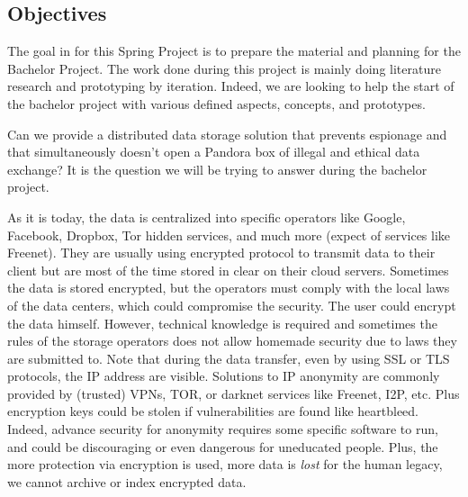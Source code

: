 
\subsection{Objectives}
The goal in for this Spring Project is to prepare the material and planning for the Bachelor Project. The work done during this project is mainly doing literature research and prototyping by iteration. Indeed, we are looking to help the start of the bachelor project with various defined aspects, concepts, and prototypes.

Can we provide a distributed data storage solution that prevents espionage and that simultaneously doesn't open a Pandora box of illegal and ethical data exchange? It is the question we will be trying to answer during the bachelor project.

As it is today, the data is centralized into specific operators like Google, Facebook, Dropbox, Tor hidden services, and much more (expect of services like Freenet\cite{Clarke2001Freenet:System}). They are usually using encrypted protocol to transmit data to their client but are most of the time stored in clear on their cloud servers. Sometimes the data is stored encrypted, but the operators must comply with the local laws of the data centers, which could compromise the security. The user could encrypt the data himself. However, technical knowledge is required and sometimes the rules of the storage operators does not allow homemade security due to laws they are submitted to. Note that during the data transfer, even by using SSL or TLS protocols, the IP address are visible. Solutions to IP anonymity are commonly provided by (trusted) VPNs, TOR\cite{Dingledine2004Tor:Router}, or darknet\cite{Delmer2009LemergenceI2p} services like Freenet, I2P\cite{Delmer2009LemergenceI2p}, etc. Plus encryption keys could be stolen if vulnerabilities are found like heartbleed\cite{Mehta2014TheBug}. Indeed, advance security for anonymity requires some specific software to run, and could be discouraging or even dangerous for uneducated people. Plus, the more protection via encryption is used, more data is \textit{lost} for the human legacy, we cannot archive or index encrypted data.

